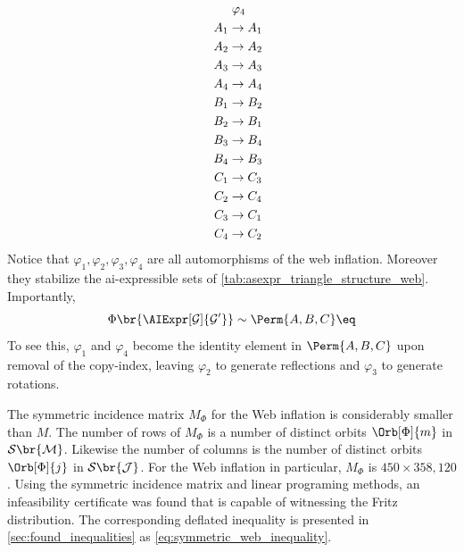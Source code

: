 \documentclass[aps, 10pt, english, twoside, pra, nofootinbib, tightenlines, longbibliography, superscriptaddress]{revtex4-1}
\renewcommand{\Events}[1]{\mathcal{S}\br{#1}} %
\begin{document}
\begin{equation}
\begin{aligned}[c]
    \end{aligned}
    \quad
    \begin{aligned}[c]
    &\hspace{1mm}\varphi_4 \\
    A_1 &\to A_1 \\A_2 &\to A_2 \\A_3 &\to A_3 \\A_4 &\to A_4 \\B_1 &\to B_2 \\B_2 &\to B_1 \\B_3 &\to B_4 \\B_4 &\to B_3 \\C_1 &\to C_3 \\C_2 &\to C_4 \\C_3 &\to C_1 \\C_4 &\to C_2
    \end{aligned}
    \end{equation}
    Notice that $\varphi_1, \varphi_2, \varphi_3, \varphi_4$ are all automorphisms of the web inflation. Moreover they stabilize the ai-expressible sets of \cref{tab:asexpr_triangle_structure_web}. Importantly,
    \[ \gp\br{\AIExpr[\graph]{\graph'}} \sim \Perm{A,B,C} \eq \]
    To see this, $\varphi_1$ and $\varphi_4$ become the identity element in $\Perm{A,B,C}$ upon removal of the copy-index, leaving $\varphi_2$ to generate reflections and $\varphi_3$ to generate rotations.

    The symmetric incidence matrix $M_{\Phi}$ for the Web inflation is considerably smaller than $M$. The number of rows of $M_{\Phi}$ is a number of distinct orbits $\Orb[\Phi]{m}$ in $\Events{\mscenario}$. Likewise the number of columns is the number of distinct orbits $\Orb[\Phi]{j}$ in $\Events{\jointvar}$. For the Web inflation in particular, $M_{\Phi}$ is $450 \times 358,120$. Using the symmetric incidence matrix and linear programing methods, an infeasibility certificate was found that is capable of witnessing the Fritz distribution. The corresponding deflated inequality is presented in \cref{sec:found_inequalities} as \cref{eq:symmetric_web_inequality}.

\end{document}
